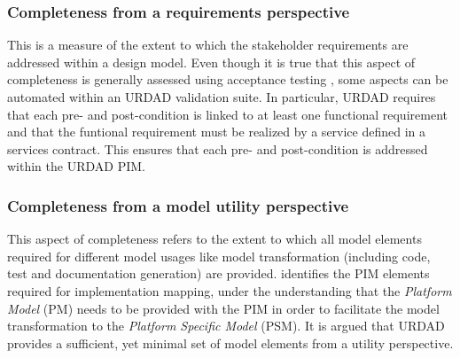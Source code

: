 
\subsubsection{Completeness from a requirements perspective}

This is a measure of the extent to which the stakeholder requirements are addressed within a design model. Even though it is true that this aspect of completeness is generally assessed using acceptance testing \cite{lange_2004:anEmpiricalAssessmentOfCompletenessInUmlDesign}, some aspects can be automated within an URDAD validation suite. In particular, URDAD requires that each pre- and post-condition is linked to at least one functional requirement and that the funtional requirement must be realized by a service defined in a services contract. This ensures that each pre- and post-condition is addressed within the URDAD PIM.


\subsubsection{Completeness from a model utility perspective}

This aspect of completeness refers to the extent to which all model elements required for different model usages like model transformation (including code, test and documentation generation) are provided.  \cite{solms_2009:generatingMdasPimUsingUrdad}  identifies the PIM elements 
required for implementation mapping, under the understanding that the {\em Platform Model} (PM) needs to be provided with the PIM in order to facilitate the model transformation to the {\em Platform Specific Model} (PSM). It is argued that URDAD provides a sufficient, yet minimal set of model elements from a utility perspective.

